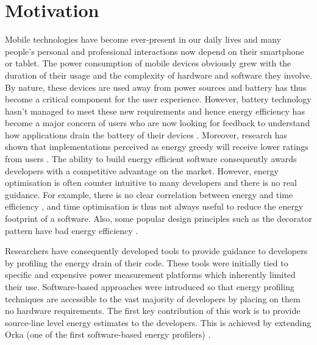 \section{Motivation}

Mobile technologies have become ever-present in our daily lives and many 
people's personal and professional interactions now depend on their 
smartphone or tablet. The power consumption of mobile devices obviously 
grew with the duration of their usage and the complexity of hardware and 
software they involve. By nature, these devices are used away from power 
sources and battery has thus become a critical component for the user 
experience. However, battery technology hasn't managed to meet these new 
requirements and hence energy efficiency has become a major concern of 
users who are now looking for feedback to understand how applications 
drain the battery of their devices \cite{heikkinen2012energy}. Moreover, 
research has shown that implementations perceived as energy greedy will 
receive lower ratings from users \cite{jabbarvand2015ecodroid}. The 
ability to build energy efficient software consequently awards 
developers with a competitive advantage on the market. However, energy 
optimisation is often counter intuitive to many developers and there is 
no real guidance. For example, there is no clear correlation between 
energy and time efficiency \cite{bunse2009choosing}, and time 
optimisation is thus not always useful to reduce the energy footprint of 
a software. Also, some popular design principles such as the decorator 
pattern have bad energy efficiency \cite{sahin2012initial}.

Researchers have consequently developed tools to provide guidance to 
developers by profiling the energy drain of their code. These tools were 
initially tied to specific and expensive power measurement platforms 
which inherently limited their use. Software-based approaches were 
introduced so that energy profiling techniques are accessible to the 
vast majority of developers by placing on them no hardware requirements. 
The first key contribution of this work is to provide source-line level 
energy estimates to the developers. This is achieved by extending Orka 
(one of the first software-based energy profilers) 
\cite{westfield2016orka}.


